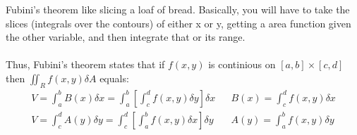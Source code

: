 \documentclass{article}
\begin{document}
Fubini's theorem like slicing a loaf of bread. Basically, you will have to take the slices (integrals over the contours) of either x or y, getting a area function given the other variable, and then integrate that or its range. \\ ~ \\
Thus, Fubini's theorem states that if $f(x, y)$ is continious on $[a, b] \times [c, d]$ then $\iint_{R} f(x, y) \delta A$ equals:
\begin{align*}
    V = \int_{a}^{b} B(x) \delta x = \int_{a}^{b} \left[ \int_{c}^{d} f(x,y) \delta y \right] \delta x  &  & B(x) = \int_{c}^{d} f(x, y) \delta x \\
    V = \int_{c}^{d} A(y) \delta y = \int_{c}^{d} \left[ \int_{a}^{b} f(x, y) \delta x \right] \delta y &  & A(y) = \int_{a}^{b} f(x, y) \delta y
\end{align*}
\end{document}
